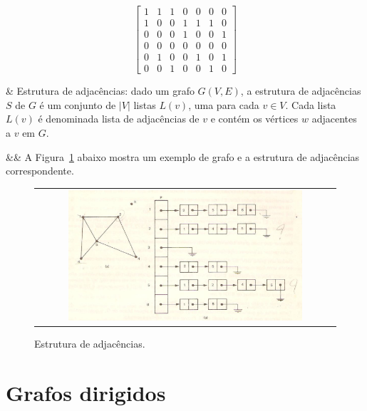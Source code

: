 \[
  \begin{bmatrix}
    1 & 1 & 1  &  0 & 0 & 0  &  0 \\
    1 & 0 & 0  &  1 & 1 & 1  &  0 \\
    0 & 0 & 0  &  1 & 0 & 0  &  1 \\
    0 & 0 & 0  &  0 & 0 & 0  &  0 \\
    0 & 1 & 0  &  0 & 1 & 0  &  1 \\
    0 & 0 & 1  &  0 & 0 & 1  &  0
  \end{bmatrix}
\]

\begin{easylist}
  & Estrutura de adjacências: dado um grafo $G(V, E)$, a estrutura de adjacências $S$ de $G$ é um conjunto de $|V|$ listas $L(v)$, uma para cada $v \in V$. Cada lista $L(v)$ é denominada lista de adjacências de $v$ e contém os vértices $w$ adjacentes a $v$ em $G$.
\end{easylist}

\begin{easylist}
  && A Figura~\ref{fig:struct} abaixo mostra um exemplo de grafo e a estrutura de adjacências correspondente.
\end{easylist}

\begin{figure}[h!]
  \begin{center}
    \begin{tabular}{c}
      \includegraphics[width=0.8\textwidth]{images/02/struct.png}
    \end{tabular}
  \end{center}
  \caption{Estrutura de adjacências.}
  \label{fig:struct}
\end{figure}




\section{Grafos dirigidos}
\label{sec:digraph}

